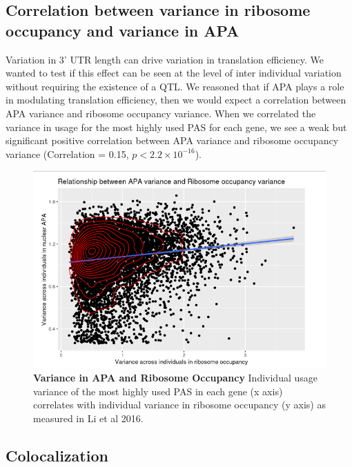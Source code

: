 \subsection{Correlation between variance in ribosome occupancy and variance in APA }\label{ch02-var-ribo}


Variation in 3' UTR length can drive variation in translation efficiency. We wanted to test if this effect can be seen at the level of inter individual variation without requiring the existence of a QTL. We reasoned that if APA plays a role in modulating translation efficiency, then we would expect a correlation between APA variance and ribosome occupancy variance. When we correlated the variance in usage for the most highly used PAS for each gene, we see a weak but significant positive correlation between APA variance and ribosome occupancy variance (Correlation = 0.15, $p <2.2\times10^{-16}$).   

\begin{figure}
\centering \includegraphics[width=5in]{img/ch02/figureAppendix4.png}
\caption[Variance in APA and Ribosome Occupancy]{\textbf{Variance in APA and Ribosome Occupancy} Individual usage variance of the most highly used PAS in each gene (x axis) correlates with individual variance in ribosome occupancy (y axis) as measured in Li et al 2016.\citep{li_rna_2016}}
\label{ffig:Supplementaryfile1-Fig4}
\end{figure} 


\subsection{Colocalization}\label{ch02-coloc}


